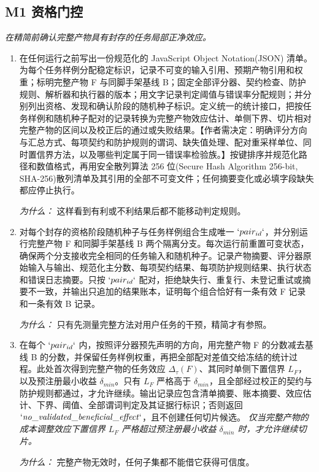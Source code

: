 \documentclass[10pt,a4paper]{article}
\begin{document}
\subsection*{M1 资格门控}
\emph{在精简前确认完整产物具有封存的任务局部正净效应。}
\begin{enumerate}[leftmargin=*,start=1]
  \item 在任何运行之前写出一份规范化的 JavaScript Object Notation(JSON) 清单。为每个任务样例分配稳定标识，记录不可变的输入引用、预期产物引用和权重；标明完整产物 F 与同脚手架基线 B；固定全部评分器、契约检查、防护规则、解析器和执行器的版本；用文字记录判定阈值与错误率分配规则；并分别列出资格、发现和确认阶段的随机种子标识。定义统一的统计接口，把按任务样例和随机种子配对的记录转换为完整产物效应估计、单侧下界、切片相对完整产物的区间以及校正后的通过或失败结果。【作者需决定：明确评分方向与汇总方式、每项契约和防护规则的谓词、缺失值处理、配对重采样单位、同时置信界方法，以及哪些判定属于同一错误率检验族。】按键排序并规范化路径和数值格式，再用安全散列算法 256 位(Secure Hash Algorithm 256-bit, SHA-256)散列清单及其引用的全部不可变文件；任何摘要变化或必填字段缺失都应停止执行。
\par\emph{为什么：} 这样看到有利或不利结果后都不能移动判定规则。
  \item 对每个封存的资格阶段随机种子与任务样例组合生成唯一 \(`pair_{id}`\)，并分别运行完整产物 F 和同脚手架基线 B 两个隔离分支。每次运行前重置可变状态，确保两个分支接收完全相同的任务输入和随机种子。记录产物摘要、评分器原始输入与输出、规范化主分数、每项契约结果、每项防护规则结果、执行状态和错误日志摘要。只按 \(`pair_{id}`\) 配对，拒绝缺失行、重复行、未登记重试或摘要不一致，并输出只追加的结果账本，证明每个组合恰好有一条有效 F 记录和一条有效 B 记录。
\par\emph{为什么：} 只有先测量完整方法对用户任务的干预，精简才有参照。
  \item 在每个 \(`pair_{id}`\) 内，按照评分器预先声明的方向，用完整产物 F 的分数减去基线 B 的分数，并保留任务样例权重，再把全部配对差值交给冻结的统计过程。此处首次得到完整产物的任务效应 \(\Delta _\tau (F)\)、其同时单侧下置信界 \(L_{F}\)，以及预注册最小收益 \(\delta _{min}\)。只有 \(L_{F}\) 严格高于 \(\delta _{min}\)，且全部经过校正的契约与防护规则都通过，才允许继续。输出记录应包含清单摘要、账本摘要、效应估计、下界、阈值、全部谓词判定及其证据行标识；否则返回 \(`\mathit{no\_validated\_beneficial\_effect}`\)，且不创建任何切片候选。
\noindent\emph{仅当完整产物的成本调整效应下置信界 \(L_{F}\) 严格超过预注册最小收益 \(\delta _{min}\) 时，才允许继续切片。}
\par{}
\par\emph{为什么：} 完整产物无效时，任何子集都不能借它获得可信度。
\end{enumerate}
\end{document}
